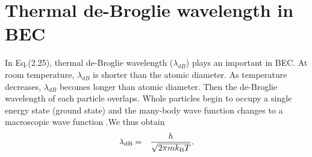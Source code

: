 \documentclass[12pt,a4paper]{report}
\newcommand{\kb} {k_{\rm B}}				            %
\begin{document}
\section{Thermal de-Broglie wavelength in BEC}
In Eq.(2.25), thermal de-Broglie wavelength ($\lambda_{dB}$) plays an important in BEC.
At room temperature, $\lambda_{dB}$ is shorter than the atomic diameter.
As temperature decreases, $\lambda_{dB}$ becomes longer than atomic diameter.
Then the de-Broglie wavelength of each particle overlaps.
Whole particles begin to occupy a single energy state (ground state) and the many-body wave function
changes to a macroscopic wave function \cite{16}.We thus obtain
\begin{eqnarray}
\lambda_{\rm dB} & = & \frac{h}{\sqrt{2 \pi m \kb T}}.
\end{eqnarray}
\end{document}
